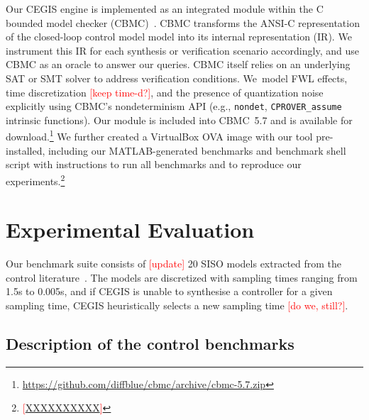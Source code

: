 \documentclass[twocolumn]{autart}    %
\renewcommand{\note}[1]{\textcolor{red}{[#1]}}
\begin{document}
Our CEGIS engine is implemented as an integrated module within the C bounded
model checker (CBMC)~\cite{ClarkeKL04}.  CBMC transforms the ANSI-C representation
of the closed-loop control model model into its internal representation (IR).  We
instrument this IR for each synthesis or verification scenario accordingly,
and use CBMC as an oracle to answer our queries.  CBMC itself relies on an
underlying SAT or SMT solver to address verification conditions.  We~model FWL
effects, time discretization \note{keep time-d?}, and the presence of quantization noise
explicitly using CBMC's nondeterminism API (e.g., \texttt{nondet},
\texttt{CPROVER\_assume} intrinsic functions).  Our module is included into
CBMC~5.7 and is available for
download.\footnote{\url{https://github.com/diffblue/cbmc/archive/cbmc-5.7.zip}}
We further created a VirtualBox OVA image with our tool pre-installed,
including our MATLAB-generated benchmarks and benchmark shell script with
instructions to run all benchmarks and to reproduce our
experiments.\footnote{\note{\url{XXXXXXXXXX}}}
%
%

\section{Experimental Evaluation}
\label{exp:evaluation}

Our benchmark suite consists of \note{update} 20 SISO models extracted from the 
control literature~\cite{acrobot,cstr,CHEN1979389,KOKOTOVIC198023,gajic2008optimal,Franklin15, maglev, converters, CTMS, gajic2008optimal}.
The models are discretized with sampling times ranging from 1.5s to 0.005s, and if CEGIS is unable to 
synthesise a controller for a given sampling time, CEGIS heuristically selects a new sampling time \note{do we, still?}.

\subsection{Description of the control benchmarks}
\label{exp:benchmarks}
\end{document}
